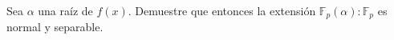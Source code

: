 Sea $\alpha$ una raíz de $f(x)$. Demuestre que entonces la extensión $\mathbb{F}_p(\alpha):\mathbb{F}_p$ es normal y separable.
